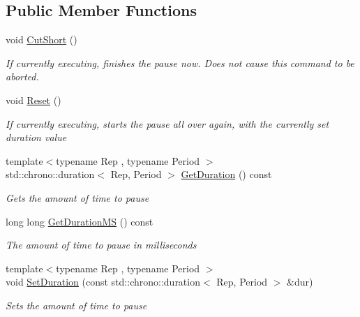 \subsection*{Public Member Functions}
\begin{DoxyCompactItemize}
\item 
void \mbox{\hyperlink{class_command_lib_1_1_pause_command_a1a02c8ebd44bd32cdc72731d2a16d232}{Cut\+Short}} ()
\begin{DoxyCompactList}\small\item\em If currently executing, finishes the pause now. Does {\itshape not} cause this command to be aborted. \end{DoxyCompactList}\item 
void \mbox{\hyperlink{class_command_lib_1_1_pause_command_abb0980872e2376aece3e184a2decd861}{Reset}} ()
\begin{DoxyCompactList}\small\item\em If currently executing, starts the pause all over again, with the currently set duration value \end{DoxyCompactList}\item 
{\footnotesize template$<$typename Rep , typename Period $>$ }\\std\+::chrono\+::duration$<$ Rep, Period $>$ \mbox{\hyperlink{class_command_lib_1_1_pause_command_aa6bf4dfa9880d58f4995090d0cd6859c}{Get\+Duration}} () const
\begin{DoxyCompactList}\small\item\em Gets the amount of time to pause \end{DoxyCompactList}\item 
long long \mbox{\hyperlink{class_command_lib_1_1_pause_command_a8b92e16e0d088945b64c78437d357cb1}{Get\+Duration\+MS}} () const
\begin{DoxyCompactList}\small\item\em The amount of time to pause in milliseconds \end{DoxyCompactList}\item 
{\footnotesize template$<$typename Rep , typename Period $>$ }\\void \mbox{\hyperlink{class_command_lib_1_1_pause_command_a1ee11b6870b84a56521caa0b8e43c560}{Set\+Duration}} (const std\+::chrono\+::duration$<$ Rep, Period $>$ \&dur)
\begin{DoxyCompactList}\small\item\em Sets the amount of time to pause \end{DoxyCompactList}\item 

\end{DoxyCompactItemize}
